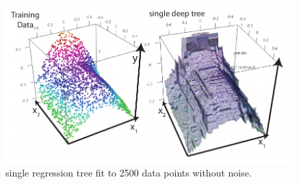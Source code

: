 \begin{figure}[!htbp]
\includegraphics[width=\textwidth,height=\textheight,keepaspectratio]{graphics/decisionTreeFit.pdf}
\caption{single regression tree fit to 2500 data points without noise.}
\label{decisionTreeFit}
\end{figure}

